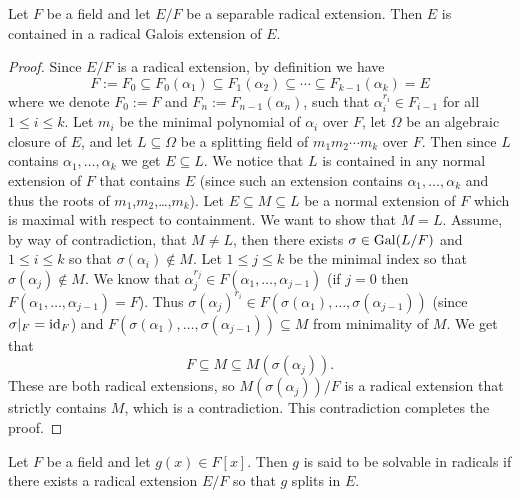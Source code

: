 \documentclass[11pt,a4paper]{article}
\begin{document}
\begin{lemma}
  \label{lem:solvable-groups}
  Let $F$ be a field and let $E/F$ be a separable radical extension.
  Then $E$ is contained in a radical Galois extension of $E$.
\end{lemma}
\begin{proof}
  Since $E/F$ is a radical extension,
  by definition we have
  \[
    F := F_0 \subseteq F_0(\alpha_1) \subseteq F_1(\alpha_2) \subseteq \cdots
    \subseteq F_{k-1}(\alpha_k) = E
  \]
  where we denote $F_0 := F$ and $F_n := F_{n-1}(\alpha_n)$,
  such that $\alpha_i^{r_i} \in F_{i-1}$ for all $1 \le i \le k$.
  Let $m_i$ be the minimal polynomial of $\alpha_i$ over $F$,
  let $\Omega$ be an algebraic closure of $E$,
  and let $L \subseteq \Omega$ be a splitting field of
  $m_1m_2 \cdots m_k$ over $F$.
  Then since $L$ contains $\alpha_1,\dots,\alpha_k$ we get $E \subseteq L$.
  We notice that $L$ is contained in any normal extension of $F$ that contains
  $E$ (since such an extension contains $\alpha_1,\dots,\alpha_k$
  and thus the roots of $m_1$,$m_2$,\dots,$m_k$).
  Let $E \subseteq M \subseteq L$ be a normal extension of $F$
  which is maximal with respect to containment.
  We want to show that $M = L$.
  Assume, by way of contradiction, that $M \neq L$,
  then there exists $\sigma \in \operatorname{Gal}(L/F)$ and $1 \le i \le k$
  so that $\sigma(\alpha_i) \notin M$.
  Let $1 \le j \le k$ be the minimal index so that $\sigma(\alpha_j) \notin M$.
  We know that $\alpha_j^{r_j} \in F(\alpha_1,\dots,\alpha_{j-1})$
  (if $j = 0$ then $F(\alpha_1,\dots,\alpha_{j-1}) = F$).
  Thus
  $\sigma(\alpha_j)^{r_i} \in F(\sigma(\alpha_1),\dots,\sigma(\alpha_{j-1}))$
  (since $\sigma\vert_F = \operatorname{id}_F$) and
  $F(\sigma(\alpha_1),\dots,\sigma(\alpha_{j-1})) \subseteq M$ from
  minimality of $M$.
  We get that
  \[
    F \subseteq M \subseteq M(\sigma(\alpha_j)).
  \]
  These are both radical extensions,
  so $M(\sigma(\alpha_j)) / F$ is a radical extension that strictly
  contains $M$, which is a contradiction.
  This contradiction completes the proof.
\end{proof}

\begin{definition}
  Let $F$ be a field and let $g(x) \in F[x]$.
  Then $g$ is said to be solvable in radicals if there exists
  a radical extension $E/F$ so that $g$ splits in $E$.
\end{definition}
\end{document}
